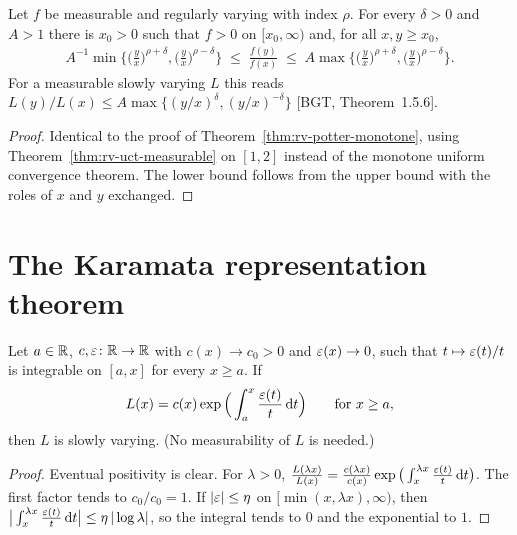 \begin{theorem}
  \label{thm:rv-potter-measurable}
  \leanok
  Let $f$ be measurable and regularly varying with index $\rho$. For every $\delta > 0$ and
  $A > 1$ there is $x_0 > 0$ such that $f > 0$ on $[x_0, \infty)$ and, for all $x, y \ge x_0$,
  \begin{align*}
    A^{-1} \min\Big\{ \Big(\frac{y}{x}\Big)^{\rho+\delta}, \Big(\frac{y}{x}\Big)^{\rho-\delta} \Big\}
    \; \le \; \frac{f(y)}{f(x)} \; \le \;
    A \max\Big\{ \Big(\frac{y}{x}\Big)^{\rho+\delta}, \Big(\frac{y}{x}\Big)^{\rho-\delta} \Big\} .
  \end{align*}
  For a measurable slowly varying $L$ this reads
  $L(y)/L(x) \le A \max\{ (y/x)^\delta, (y/x)^{-\delta} \}$
  [BGT, Theorem~1.5.6].
\end{theorem}
\begin{proof}
  \leanok
  Identical to the proof of Theorem~\ref{thm:rv-potter-monotone}, using
  Theorem~\ref{thm:rv-uct-measurable} on $[1,2]$ instead of the monotone uniform
  convergence theorem. The lower bound follows from the upper bound with the roles
  of $x$ and $y$ exchanged.
\end{proof}


\section{The Karamata representation theorem}

\begin{lemma}
  \label{lem:sv-of-representation}
  \leanok
  Let $a \in \mathbb{R}$, $c, \varepsilon \colon \mathbb{R} \to \mathbb{R}$ with $c(x) \to c_0 > 0$ and $\varepsilon(x) \to 0$,
  such that $t \mapsto \varepsilon(t)/t$ is integrable on $[a, x]$ for every $x \ge a$. If
  \begin{align*}
    L(x) = c(x) \exp\Big( \int_a^x \frac{\varepsilon(t)}{t} \, \mathrm{d} t \Big) \qquad \text{for } x \ge a ,
  \end{align*}
  then $L$ is slowly varying. (No measurability of $L$ is needed.)
\end{lemma}
\begin{proof}
  \leanok
  Eventual positivity is clear. For $\lambda > 0$,
  $\frac{L(\lambda x)}{L(x)} = \frac{c(\lambda x)}{c(x)} \exp \big( \int_x^{\lambda x} \frac{\varepsilon(t)}{t} \, \mathrm{d} t \big)$.
  The first factor tends to $c_0 / c_0 = 1$. If $|\varepsilon| \le \eta$ on $[\min(x,\lambda x), \infty)$,
  then $\big| \int_x^{\lambda x} \frac{\varepsilon(t)}{t} \, \mathrm{d} t \big| \le \eta \, |\log \lambda|$, so the
  integral tends to $0$ and the exponential to $1$.
\end{proof}

